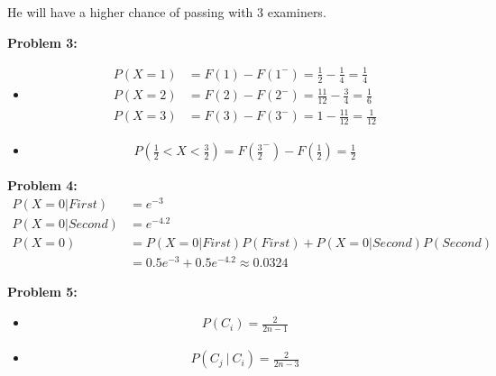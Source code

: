 \documentclass[12pt]{article}
\begin{document}
He will have a higher chance of passing with 3 examiners.

\noindent \textbf{Problem 3:}
\begin{itemize}
    \item [(a)]
          \begin{align*}
              P(X=1) & = F(1) - F(1^-) = \frac{1}{2} - \frac{1}{4} = \frac{1}{4}   \\
              P(X=2) & = F(2) - F(2^-) = \frac{11}{12} - \frac{3}{4} = \frac{1}{6} \\
              P(X=3) & = F(3) - F(3^-) = 1 - \frac{11}{12} = \frac{1}{12}
          \end{align*}

    \item [(b)]
          \begin{align*}
              P(\frac{1}{2} < X < \frac{3}{2}) = F(\frac{3}{2}^-) - F(\frac{1}{2}) = \frac{1}{2}
          \end{align*}
\end{itemize}

\noindent \textbf{Problem 4:}
\begin{align*}
    P(X = 0 | First)  & = e^{-3}                                                   \\
    P(X = 0 | Second) & = e^{-4.2}                                                 \\
    P(X=0)            & = P(X = 0 | First) P(First) +  P(X = 0 | Second) P(Second) \\
                      & = 0.5e^{-3} + 0.5e^{-4.2} \approx 0.0324
\end{align*}

\noindent \textbf{Problem 5:}
\begin{itemize}
    \item [(a)]
          \begin{align*}
              P(C_i) = \frac{2}{2n-1}
          \end{align*}

    \item [(b)]
          \begin{align*}
              P(C_j ~|~ C_i) = \frac{2}{2n-3}
          \end{align*}
\end{itemize}
\end{document}
